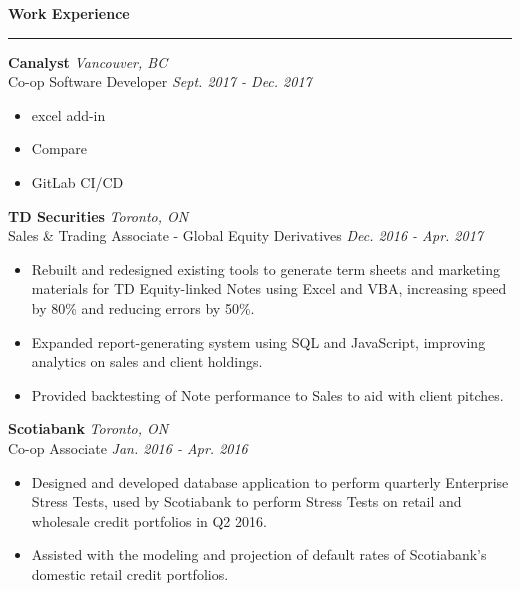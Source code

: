 \documentclass{letter}
\begin{document}
	\begin{flushleft}
		{\Large \textbf{Work Experience}}
		\rule[5pt]{\textwidth}{0.4pt}
		\vspace{-15pt}
		{\large\textbf{Canalyst}}  \hfill \textit{Vancouver, BC} \\
		\vspace{15pt}
		Co-op Software Developer \hfill \textit{Sept. 2017 - Dec. 2017}
		\vspace{-9pt}
		\begin{itemize}
			\item excel add-in \vspace{-3pt}
			\item Compare \vspace{-3pt}
			\item GitLab CI/CD
		\end{itemize}

		{\large\textbf{TD Securities}}  \hfill \textit{Toronto, ON} \\
		\vspace{1pt}
		Sales \& Trading Associate - Global Equity Derivatives \hfill \textit{Dec. 2016 - Apr. 2017}
		\vspace{-9pt}
		\begin{itemize}
			\item Rebuilt and redesigned existing tools to generate term sheets and marketing materials for TD Equity-linked Notes using Excel and VBA, increasing speed by 80\% and reducing errors by 50\%. \vspace{-3pt}
			\item Expanded report-generating system using SQL and JavaScript, improving analytics on sales and client holdings. \vspace{-3pt}
			\item Provided backtesting of Note performance to Sales to aid with client pitches.
		\end{itemize}
	
		{\large\textbf{Scotiabank}}  \hfill \textit{Toronto, ON} \\
		\vspace{1pt}
		Co-op Associate \hfill \textit{Jan. 2016 - Apr. 2016}
		\vspace{-9pt}
		\begin{itemize}
			\item Designed and developed database application to perform quarterly Enterprise Stress Tests, used by Scotiabank to perform Stress Tests on retail and wholesale credit portfolios in Q2 2016.\vspace{-3pt}
			\item Assisted with the modeling and projection of default rates of Scotiabank's domestic retail credit portfolios. 
		\end{itemize}
	\end{flushleft}
\end{document}
